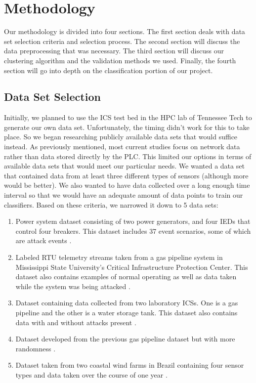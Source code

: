 \documentclass[letterpaper, 10 pt, conference]{ieeeconf}  %
\begin{document}
\section{Methodology}
Our methodology is divided into four sections. The first section deals with data set selection criteria and selection process. The second section will discuss the data preprocessing that was necessary. The third section will discuss our clustering algorithm and the validation methods we used. Finally, the fourth section will go into depth on the classification portion of our project.

\subsection{Data Set Selection}
Initially, we planned to use the ICS test bed in the HPC lab of Tennessee Tech to generate our own data set. Unfortunately, the timing didn't work for this to take place. So we began researching publicly available data sets that would suffice instead. As previously mentioned, most current studies focus on network data rather than data stored directly by the PLC. This limited our options in terms of available data sets that would meet our particular needs. We wanted a data set that contained data from at least three different types of sensors (although more would be better). We also wanted to have data collected over a long enough time interval so that we would have an adequate amount of data points to train our classifiers. Based on these criteria, we narrowed it down to 5 data sets:
\begin{enumerate}
    \item Power system dataset consisting of two power generators, and four IEDs that control four breakers. This dataset includes 37 event scenarios, some of which are attack events \cite{pan2015developing}.
    \item Labeled RTU telemetry streams taken from a gas pipeline system in Mississippi State University's Critical Infrastructure Protection Center. This dataset also contains examples of normal operating as well as data taken while the system was being attacked \cite{beaver2013evaluation}.
    \item Dataset containing data collected from two laboratory ICSs. One is a gas pipeline and the other is a water storage tank. This dataset also contains data with and without attacks present \cite{morris2011control}.
    \item Dataset developed from the previous gas pipeline dataset but with more randomness \cite{morris2015industrial}.
    \item Dataset taken from two coastal wind farms in Brazil containing four sensor types and data taken over the course of one year \cite{passos_sakagami_santos_haas_taves_2017}.
\end{enumerate}
\end{document}
